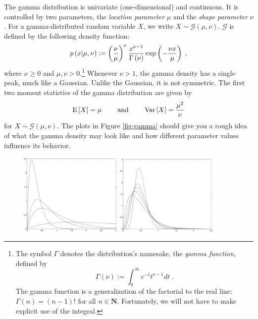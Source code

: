 \documentclass[]{../util/ColumbiaAssm}
\begin{document}
\begin{questions}
The gamma distribution is univariate (one-dimensional) and
continuous. It is controlled by two parameters, the 
{\em location parameter} $\mu$ and the {\em shape parameter} $\nu$.
For a gamma-distributed random variable $X$, we write
$X\sim\mathcal{G}\left(\mu,\nu\right)$. $\mathcal{G}$ is
defined by the following density function:
\begin{equation}
  p\left(  x | \mu,\nu \right) := \left(\frac{\nu}{\mu}\right)^{\nu}
  \frac{x^{\nu - 1}}{\Gamma\left( \nu \right)}
  \exp\left( -\frac{\nu x}{\mu} \right) \; , \nonumber
\end{equation}
where $x \geq 0$ and $\mu,\nu > 0$.\footnote{ The symbol $\Gamma$ denotes the distribution's
  namesake, the {\em gamma function}, defined by
  \begin{equation*}
    \Gamma\left( \nu \right) := \int_{0}^{\infty} e^{- t} t^{\nu-1}
    dt \; . \nonumber
  \end{equation*} 
  The gamma function is a generalization of the factorial
  to the real line: $\Gamma\left( n \right) = \left(
  n - 1 \right) !$ for all $n\in\mathbf{N}$. Fortunately, we will not
  have to make explicit use of the integral.}
Whenever $\nu > 1$, the gamma density has a single peak, much like
a Gaussian. Unlike the Gaussian, it is not symmetric.
The first two moment statistics of the gamma distribution are
given by
\begin{equation}
  \label{gammaStatistics}
  \mbox{E}\left[ X \right] = \mu \qquad \mbox{ and } \qquad \mbox{Var}\left[ X \right] = \frac{\mu^2}{\nu}
\end{equation}
for $X\sim\mathcal{G}\left(\mu,\nu\right)$.
The plots in Figure \ref{fig:gamma}
should give you a rough idea of what the
gamma density may look like and how different parameter values
influence its behavior.
\begin{figure}[t]
\begin{center}
  \includegraphics[width=5cm]{analytic_mle__1.pdf}
  \includegraphics[width=5cm]{analytic_mle__2.pdf}

\end{center}
\end{figure}
\end{questions}
\end{document}
